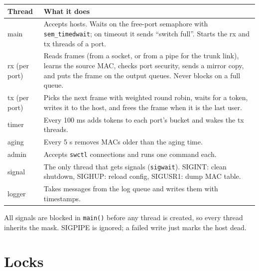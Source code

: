 \documentclass[11pt,a4paper]{article}
\begin{document}
\begin{tabular}{@{}lp{12.3cm}@{}}
\toprule
Thread & What it does \\
\midrule
main & Accepts hosts. Waits on the free-port semaphore with \texttt{sem\_timedwait};
       on timeout it sends ``switch full''. Starts the rx and tx threads of a port. \\
rx (per port) & Reads frames (from a socket, or from a pipe for the trunk link), learns the source MAC, checks port security,
       sends a mirror copy, and puts the frame on the output queues. Never blocks on a full queue. \\
tx (per port) & Picks the next frame with weighted round robin, waits for a token,
       writes it to the host, and frees the frame when it is the last user. \\
timer & Every 100 ms adds tokens to each port's bucket and wakes the tx threads. \\
aging & Every 5 s removes MACs older than the aging time. \\
admin & Accepts \texttt{swctl} connections and runs one command each. \\
signal & The only thread that gets signals (\texttt{sigwait}).
       SIGINT: clean shutdown, SIGHUP: reload config, SIGUSR1: dump MAC table. \\
logger & Takes messages from the log queue and writes them with timestamps. \\
\bottomrule
\end{tabular}

All signals are blocked in \texttt{main()} before any thread is created, so every
thread inherits the mask. SIGPIPE is ignored; a failed write just marks the host dead.

\section{Locks}
\end{document}
